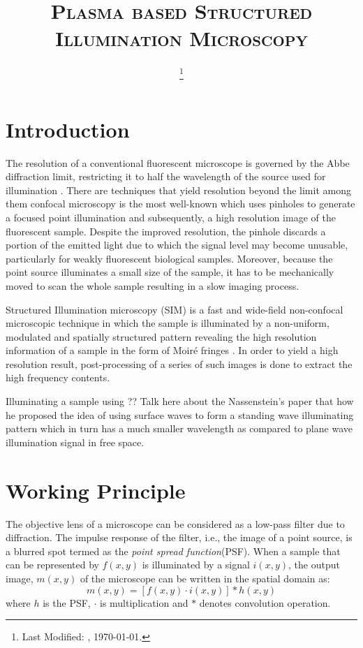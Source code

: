 \documentclass[11pt]{article}
\begin{document}
\title{\textsc{Plasma based Structured Illumination Microscopy}\\}
\date{\footnote{Last Modified: \currenttime, \today.}}
\maketitle

\section{Introduction}


The resolution of a conventional fluorescent microscope is governed by the Abbe diffraction limit, restricting it to half the wavelength of the source used for illumination \cite{0521639212}. There are techniques that yield resolution beyond the limit among them confocal microscopy is the most well-known which uses pinholes to generate a focused point illumination and subsequently, a high resolution image of the fluorescent sample. Despite the improved resolution, the pinhole discards a portion of the emitted light due to which the signal level may become unusable, particularly for weakly fluorescent biological samples. Moreover, because the point source illuminates a small size of the sample, it has to be mechanically moved to scan the whole sample resulting in a slow imaging process.

Structured Illumination microscopy (SIM) is a fast and wide-field non-confocal microscopic technique in which the sample is illuminated by a non-uniform, modulated and spatially structured pattern revealing the high resolution information of a sample in the form of Moiré fringes \cite{Gustafsson_2000,Heintzmann1999a}. In order to yield a high resolution result, post-processing of a series of such images is done to extract the high frequency contents.

Illuminating a sample using
?? Talk here about the Nassenstein's paper that how he proposed the idea of using surface waves to form a standing wave illuminating pattern which in turn has a much smaller wavelength as compared to plane wave illumination signal in free space.

\section{Working Principle}

The objective lens of a microscope can be considered as a low-pass filter due to diffraction. The impulse response of the filter, i.e., the image of a point source, is a blurred spot termed as the \emph{point spread function}(PSF). When a sample that can be represented by $f(x,y)$ is illuminated by a signal $i(x,y)$, the output image, $m(x,y)$ of the microscope can be written in the spatial domain as:
%
\begin{equation}
  m(x,y) = \left[ f(x,y) \cdot i(x,y) \right] \ast h(x,y)
  \label{eq:microscope}
\end{equation}
%
where $h$ is the PSF, $\cdot$ is multiplication and $\ast$ denotes convolution operation.
\end{document}
